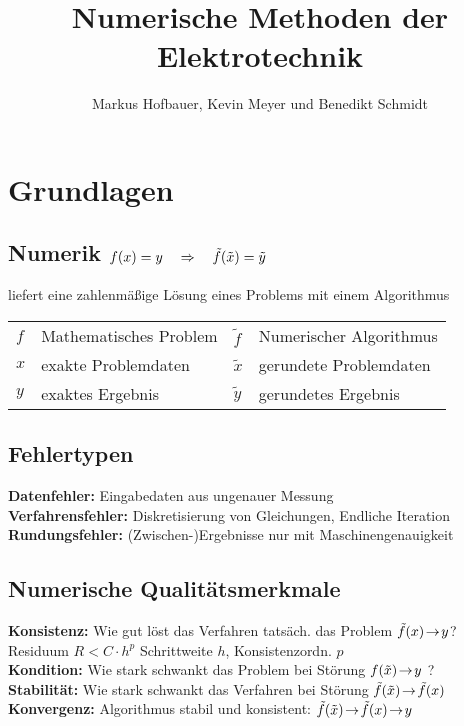 \documentclass[german]{latex4ei/latex4ei_sheet}
\title{Numerische Methoden der Elektrotechnik}
\author{Markus Hofbauer, Kevin Meyer und Benedikt Schmidt}
\begin{document}
\ifdefined\GitRevision{}\fi

\maketitle

\section{Grundlagen}
\begin{sectionbox}
	\subsection[Numerik]{Numerik $f(x) = y \quad \Rightarrow \quad \tilde f(\tilde x) = \tilde y$}
	liefert eine zahlenmäßige Lösung eines Problems mit einem Algorithmus\\[-1em]
	\begin{symbolbox}
		\begin{tabular*}{\columnwidth}{@{\ }l@{\ }l@{\qquad}l@{\ }l@{}}
			$f$ & Mathematisches Problem & $\tilde f$ & Numerischer Algorithmus\\
			$x$ & exakte Problemdaten & $\tilde x$ & gerundete Problemdaten\\
			$y$ & exaktes Ergebnis & $\tilde y$ & gerundetes Ergebnis\\
		\end{tabular*}
	\end{symbolbox}

	\subsection{Fehlertypen}
	\textbf{Datenfehler:} Eingabedaten aus ungenauer Messung\\
	\textbf{Verfahrensfehler:} Diskretisierung von Gleichungen, Endliche Iteration\\
	\textbf{Rundungsfehler:} (Zwischen-)Ergebnisse nur mit Maschinengenauigkeit

	\subsection{Numerische Qualitätsmerkmale}
	\textbf{Konsistenz:} Wie gut löst das Verfahren tatsäch. das Problem $\tilde f(x)\!\rightarrow\!y$?\\
	Residuum $R < C \cdot h^p$ \quad Schrittweite $h$, Konsistenzordn. $p$\\
	\textbf{Kondition:} Wie stark schwankt das Problem bei Störung $f(\tilde x)\!\rightarrow\!y$ ?\\[0.1em]
	\textbf{Stabilität:} Wie stark schwankt das Verfahren bei Störung $\tilde f(\tilde x)\!\rightarrow\!\tilde f(x)$
	\textbf{Konvergenz:} Algorithmus stabil und konsistent:  $\tilde f(\tilde x)\!\rightarrow\!\tilde f(x)\!\rightarrow\!y$
\end{sectionbox}
\end{document}
